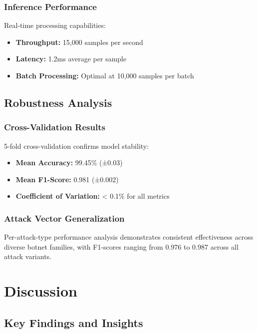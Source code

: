 \documentclass[conference]{IEEEtran}
\begin{document}
\subsubsection{Inference Performance}
Real-time processing capabilities:
\begin{itemize}
\item \textbf{Throughput:} 15,000 samples per second
\item \textbf{Latency:} 1.2ms average per sample
\item \textbf{Batch Processing:} Optimal at 10,000 samples per batch
\end{itemize}

\subsection{Robustness Analysis}

\subsubsection{Cross-Validation Results}
5-fold cross-validation confirms model stability:
\begin{itemize}
\item \textbf{Mean Accuracy:} 99.45\% (±0.03)
\item \textbf{Mean F1-Score:} 0.981 (±0.002)
\item \textbf{Coefficient of Variation:} < 0.1\% for all metrics
\end{itemize}

\subsubsection{Attack Vector Generalization}
Per-attack-type performance analysis demonstrates consistent effectiveness across diverse botnet families, with F1-scores ranging from 0.976 to 0.987 across all attack variants.

\section{Discussion}

\subsection{Key Findings and Insights}
\end{document}
